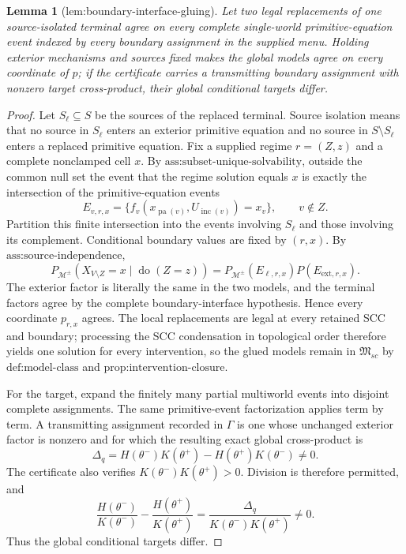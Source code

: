 \documentclass{article}
\newtheorem{lemma}{Lemma}
\begin{document}
\begin{lemma}[lem:boundary-interface-gluing]\label{lem:boundary-interface-gluing}
Let two legal replacements of one source-isolated terminal agree on every complete single-world primitive-equation event indexed by every boundary assignment in the supplied menu. Holding exterior mechanisms and sources fixed makes the global models agree on every coordinate of \(p\); if the certificate carries a transmitting boundary assignment with nonzero target cross-product, their global conditional targets differ.
\end{lemma}
\begin{proof}
Let \(S_\ell\subseteq S\) be the sources of the replaced terminal.  Source isolation means that no source in \(S_\ell\) enters an exterior primitive equation and no source in \(S\setminus S_\ell\) enters a replaced primitive equation.  Fix a supplied regime \(r=(Z,z)\) and a complete nonclamped cell \(x\).  By \(\text{ass:subset-unique-solvability}\), outside the common null set the event that the regime solution equals \(x\) is exactly the intersection of the primitive-equation events
\[
 E_{v,r,x}=\{f_v(x_{\operatorname{pa}(v)},U_{\operatorname{inc}(v)})=x_v\},\qquad v\notin Z.
\]
Partition this finite intersection into the events involving \(S_\ell\) and those involving its complement.  Conditional boundary values are fixed by \((r,x)\).  By \(\text{ass:source-independence}\),
\[
 P_{\mathcal M^\pm}(X_{V\setminus Z}=x\mid\operatorname{do}(Z=z))
 =P_{\mathcal M^\pm}(E_{\ell,r,x})P(E_{\mathrm{ext},r,x}).
\]
The exterior factor is literally the same in the two models, and the terminal factors agree by the complete boundary-interface hypothesis.  Hence every coordinate \(p_{r,x}\) agrees.  The local replacements are legal at every retained SCC and boundary; processing the SCC condensation in topological order therefore yields one solution for every intervention, so the glued models remain in \(\mathfrak M_{sc}\) by \(\text{def:model-class}\) and \(\text{prop:intervention-closure}\).

For the target, expand the finitely many partial multiworld events into disjoint complete assignments.  The same primitive-event factorization applies term by term.  A transmitting assignment recorded in \(\Gamma\) is one whose unchanged exterior factor is nonzero and for which the resulting exact global cross-product is
\[
 \Delta_q=H(\theta^-)K(\theta^+)-H(\theta^+)K(\theta^-)\ne0.
\]
The certificate also verifies \(K(\theta^-)K(\theta^+)>0\).  Division is therefore permitted, and
\[
 \frac{H(\theta^-)}{K(\theta^-)}-\frac{H(\theta^+)}{K(\theta^+)}
 =\frac{\Delta_q}{K(\theta^-)K(\theta^+)}\ne0.
\]
Thus the global conditional targets differ.


\end{proof}
\end{document}
